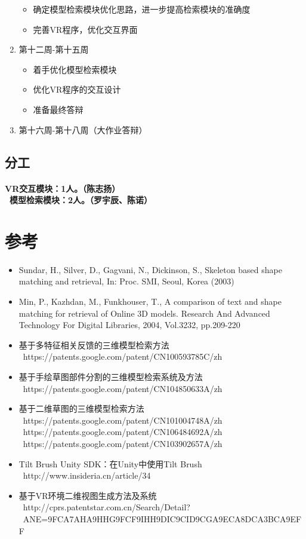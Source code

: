 \documentclass{article}
\begin{document}
\begin{enumerate}
\begin{itemize}
        \item 确定模型检索模块优化思路，进一步提高检索模块的准确度
        \item 完善VR程序，优化交互界面
    \end{itemize}
    \item 第十二周-第十五周
    \begin{itemize}
        \item 着手优化模型检索模块
        \item 优化VR程序的交互设计
        \item 准备最终答辩
    \end{itemize}
    \item 第十六周-第十八周（大作业答辩）
\end{enumerate}
\subsection{分工}
\paragraph{VR交互模块：1人。（陈志扬） \\\ 模型检索模块：2人。（罗宇辰、陈诺）
}

\section{参考}
\begin{itemize}
    \item Sundar, H., Silver, D., Gagvani, N., Dickinson, S., Skeleton based shape matching and retrieval, In: Proc. SMI, Seoul, Korea (2003)
    \item Min, P., Kazhdan, M., Funkhouser, T., A comparison of text and shape matching for retrieval of Online 3D models. Research And Advanced Technology For Digital Libraries, 2004, Vol.3232, pp.209-220
    \item 基于多特征相关反馈的三维模型检索方法 \\\ https://patents.google.com/patent/CN100593785C/zh
    \item 基于手绘草图部件分割的三维模型检索系统及方法 \\\ https://patents.google.com/patent/CN104850633A/zh
    \item 基于二维草图的三维模型检索方法 \\\ https://patents.google.com/patent/CN101004748A/zh \\\ https://patents.google.com/patent/CN106484692A/zh \\\ https://patents.google.com/patent/CN103902657A/zh
    \item Tilt Brush Unity SDK：在Unity中使用Tilt Brush \\\ http://www.insideria.cn/article/34
    \item 基于VR环境二维视图生成方法及系统 \\\
    http://cprs.patentstar.com.cn/Search/Detail?\\\ ANE=9FCA7AHA9HHG9FCF9IHH9DIC9CID9CGA9ECA8DCA3BCA9EFF

\end{itemize}
\end{document}
